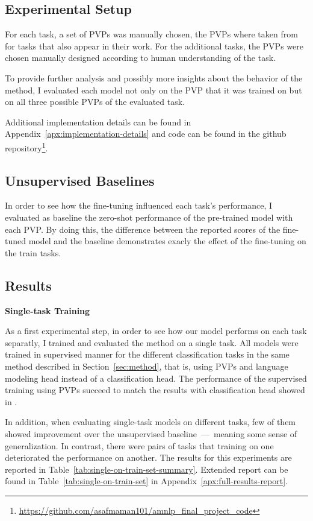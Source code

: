 \documentclass[11pt,a4paper]{article}
\begin{document}
\subsection{Experimental Setup}
\label{sub-sec:experimental-setup}
For each task, a set of PVPs was manually chosen, the PVPs where taken from \citet{schick2020exploiting} for tasks that also appear in their work.
For the additional tasks, the PVPs were chosen manually designed according to human understanding of the task. 

To provide further analysis and possibly more insights about the behavior of the method, I evaluated each model not only on the PVP that it was trained on but on all three possible PVPs of the evaluated task.

Additional implementation details can be found in Appendix~\ref{apx:implementation-details} and code can be found in the github repository\footnote{\url{https://github.com/asafmaman101/amnlp_final_project_code}}.

\subsection{Unsupervised Baselines}
In order to see how the fine-tuning influenced each task's performance, I evaluated as baseline the zero-shot performance of the pre-trained model with each PVP.
By doing this, the difference between the reported scores of the fine-tuned model and the baseline demonstrates exacly the effect of the fine-tuning on the train tasks.

\subsection{Results}
\noindent\textbf{Single-task Training}\quad

As a first experimental step, in order to see how our model performs on each task separatly, I trained and evaluated the method on a single task.
All models were trained in supervised manner for the different classification tasks in the same method described in Section~\ref{sec:method}, that is, using PVPs and language modeling head instead of a classification head.
The performance of the supervised training using PVPs succeed to match the results with classification head showed in \citet{schick2020exploiting}.

In addition, when evaluating single-task models on different tasks, few of them showed improvement over the unsupervised baseline~---~meaning some sense of generalization.
In contrast, there were pairs of tasks that training on one deteriorated the performance on another.
The results for this experiments are reported in Table~\ref{tab:single-on-train-set-summary}.
Extended report can be found in Table~\ref{tab:single-on-train-set} in Appendix~\ref{apx:full-results-report}.
\end{document}
